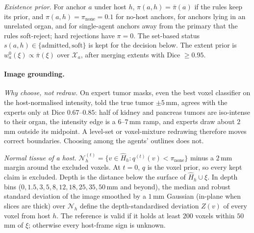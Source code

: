\documentclass[fleqn,10pt]{olplainarticle}
\begin{document}
\emph{Existence prior.} For anchor $a$ under host $h$, $\pi(a,h)=\bar\pi(a)$ if the rules keep its prior, and
$\pi(a,h)=\pi_{\mathrm{none}}=0.1$ for no-host anchors, for anchors lying in an unrelated organ, and for single-agent
anchors away from the primary that the rules soft-reject; hard rejections have $\pi=0$. The set-based status $s(a,h)\in\{\text{admitted},\text{soft}\}$ is kept for the
decision below. The extent prior is $w^{0}_a(\xi)\propto\bar\pi(\xi)$ over $\mathcal{X}_a$, after merging extents with Dice
$\ge0.95$.

\paragraph{Image grounding.}
\label{sec:grounding_details}
\emph{Why choose, not redraw.} On expert tumor masks, even the best voxel classifier on the host-normalised intensity, told
the true tumor $\pm5$\,mm, agrees with the experts only at Dice $0.67$--$0.85$: half of kidney and pancreas tumors are
iso-intense to their organ, the intensity edge is a $6$--$7$\,mm ramp, and experts draw about $2$\,mm outside its midpoint.
A level-set or voxel-mixture redrawing therefore moves correct boundaries. Choosing among the agents' outlines does not.

\emph{Normal tissue of a host.} $\mathcal{N}^{(t)}_h=\{v\in\hat H_h: q^{(t)}(v)<\pi_{\mathrm{none}}\}$ minus a $2$\,mm margin
around the excluded voxels. At $t=0$, $q$ is the voxel prior, so every kept claim is excluded. Depth is the distance below the
surface of $\hat H_h\cup\xi$. In depth bins ($0,1.5,3,5,8,12,18,25,35,50$\,mm and beyond), the median and robust standard
deviation of the image smoothed by a $1$\,mm Gaussian (in-plane when slices are thick) over $\mathcal{N}_h$ define the
depth-standardised deviation $Z(v)$ of every voxel from host $h$. The reference is valid if it holds at least $200$ voxels within
$50$\,mm of $\xi$; otherwise every host-frame sign is unknown.
\end{document}
